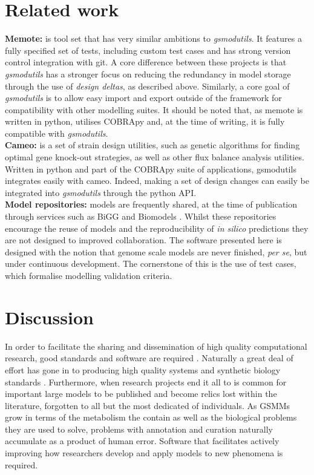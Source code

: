 \documentclass[journal=asbcd6,10pt]{achemso}
\begin{document}
\section{Related work}
\textbf{Memote:} \cite{lieven2017memote} is tool set that has very similar ambitions to \textit{gsmodutils}.
It features a fully specified set of tests, including custom test cases and has strong version control integration with git.
A core difference between these projects is that \textit{gsmodutils} has a stronger focus on reducing the redundancy in model storage through the use of \textit{design deltas}, as described above.
Similarly, a core goal of \textit{gsmodutils} is to allow easy import and export outside of the framework for compatibility with other modelling suites.
It should be noted that, as memote is written in python, utilises COBRApy and, at the time of writing, it is fully compatible with \textit{gsmodutils}.
\\
\textbf{Cameo:} \cite{cardoso2017cameo} is a set of strain design utilities, such as genetic algorithms for finding optimal gene knock-out
strategies, as well as other flux balance analysis utilities. Written in python and part of the COBRApy suite of applications,
gsmodutils integrates easily with cameo.
Indeed, making a set of design changes can easily be integrated into \textit{gsmodutils} through the python API.
\\
\textbf{Model repositories:} models are frequently shared, at the time of publication through services such as BiGG \cite{king2015bigg} and Biomodels \cite{chelliah2013biomodels}. 
Whilst these repositories encourage the reuse of models and the reproducibility of \textit{in silico} predictions they are not designed to improved collaboration.
The software presented here is designed with the notion that genome scale models are never finished, \textit{per se}, but under continuous development.
The cornerstone of this is the use of test cases, which formalise modelling validation criteria.


\section{Discussion}
In order to facilitate the sharing and dissemination of high quality computational research, good standards and software are required \cite{jimenez2017four}.
Naturally a great deal of effort has gone in to producing high quality systems and synthetic biology standards \cite{hucka2003systems, cox2018synthetic}.
Furthermore, when research projects end it all to is common for important large models to be published and become relics lost within the literature, forgotten to all but the most dedicated of individuals.
As GSMMs grow in terms of the metabolism the contain as well as the biological problems they are used to solve, problems with annotation and curation naturally accumulate as a product of human error.
Software that facilitates actively improving how researchers develop and apply models to new phenomena is required.
\end{document}
